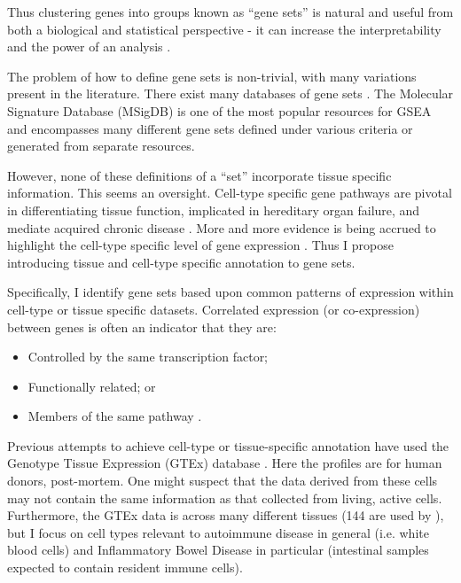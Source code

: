 \documentclass[12pt]{article} %
\begin{document}
	Thus clustering genes into groups known as ``gene sets'' is natural and useful from both a biological and statistical perspective - it can increase the interpretability and the power of an analysis \citep{NicaExpressionquantitativetrait2013, VosaUnravelingpolygenicarchitecture2018}.
	
	
	The problem of how to define gene sets is non-trivial, with many variations present in the literature. There exist many databases of gene sets \citep{AshburnerGeneOntologytool2000a, KanehisaNewapproachunderstanding2019, SzklarczykSTRINGv11protein2019}. The Molecular Signature Database \citep{SubramanianGenesetenrichment2005a} (MSigDB) is one of the most popular resources for GSEA and encompasses many different gene sets defined under various criteria or generated from separate resources. 
	
	However, none of these definitions of a ``set'' incorporate tissue specific information. This seems an oversight. Cell-type specific gene pathways are pivotal in differentiating tissue function, implicated in hereditary organ failure, and mediate acquired chronic disease \citep{JuDefiningcelltypespecificity2013a}. More and more evidence is being accrued to highlight the cell-type specific level of gene expression \citep{GrundbergMappingcistransregulatory2012, OngEnhancerfunctionnew2011, ManiatisRegulationinducibletissuespecific1987}. Thus I propose introducing tissue and cell-type specific annotation to gene sets. 
	
	Specifically, I identify gene sets based upon common patterns of expression within cell-type or tissue specific datasets. Correlated expression (or co-expression) between genes is often an indicator that they are:
	\begin{itemize}
		\item Controlled by the same transcription factor;
		\item Functionally related; or
		\item Members of the same pathway \citep{WeirauchGeneCoexpressionNetworks2011}.
	\end{itemize}

	
	Previous attempts to achieve cell-type or tissue-specific annotation have used the Genotype Tissue Expression (GTEx) \citep{GTExConsortiumGeneticeffectsgene2017} database \citep{LonsdaleGenotypeTissueExpressionGTEx2013}. Here the profiles are for human donors,
	post-mortem. One might suspect that the data derived from these cells may not contain the same information as that collected from living, active cells. Furthermore, the GTEx data is across many different tissues (144 are used by \citet{LonsdaleGenotypeTissueExpressionGTEx2013}), but I focus on cell types relevant to autoimmune disease in general (i.e. white blood cells) and Inflammatory Bowel Disease in particular (intestinal samples expected to contain resident immune cells).
	
\end{document}
